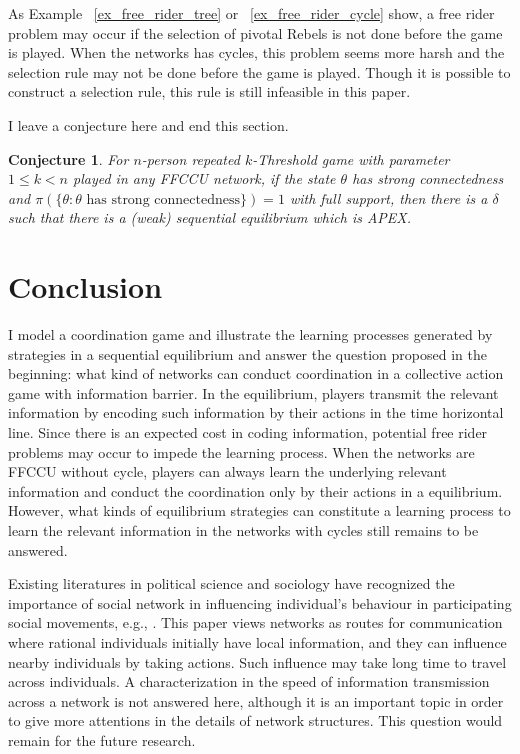 \documentclass[12pt,letter]{article}
\newtheorem{conjecture}{Conjecture}[section]
\theoremstyle{definition}
\theoremstyle{remark}
\theoremstyle{claim}
\begin{document}
As Example ~\ref{ex_free_rider_tree} or ~\ref{ex_free_rider_cycle} show, a free rider problem may occur if the selection of pivotal Rebels is not done before the game is played. When the networks has cycles, this problem seems more harsh and the selection rule may not be done before the game is played. Though it is possible to construct a selection rule, this rule is still infeasible in this paper. 

I leave a conjecture here and end this section.

\begin{conjecture}
\label{thm_main_result}
For $n$-person repeated $k$-Threshold game with parameter $1\leq k < n$ played in any FFCCU network,
if the state $\theta$ has strong connectedness and $\pi(\{\theta: \theta\text{ has strong connectedness}\})=1$ with full support, then there is a $\delta$ such that there is a (weak) sequential equilibrium which is APEX.
\end{conjecture}



\section{Conclusion}
\label{sec:con}

I model a coordination game and illustrate the learning processes generated by strategies in a sequential equilibrium and answer the question proposed in the beginning: what kind of networks can conduct coordination in a collective action game with information barrier. In the equilibrium, players transmit the relevant information by encoding such information by their actions in the time horizontal line. Since there is an expected cost in coding information, potential free rider problems may occur to impede the learning process. When the networks are FFCCU without cycle, players can always learn the underlying relevant information and conduct the coordination only by their actions in a equilibrium. However, what kinds of equilibrium strategies can constitute a learning process to learn the relevant information in the networks with cycles still remains to be answered.

Existing literatures in political science and sociology have recognized the importance of social network in influencing individual's behaviour in participating social movements, e.g., \citep{Passy2003}\citep{McAdam2003}\citep{Siegel2009}. This paper views networks as routes for communication where rational individuals initially have local information, and they can influence nearby individuals by taking actions. Such influence may take long time to travel across individuals. A characterization in the speed of information transmission across a network is not answered here, although it is an important topic in order to give more attentions in the details of network structures. This question would remain for the future research.
\end{document}
